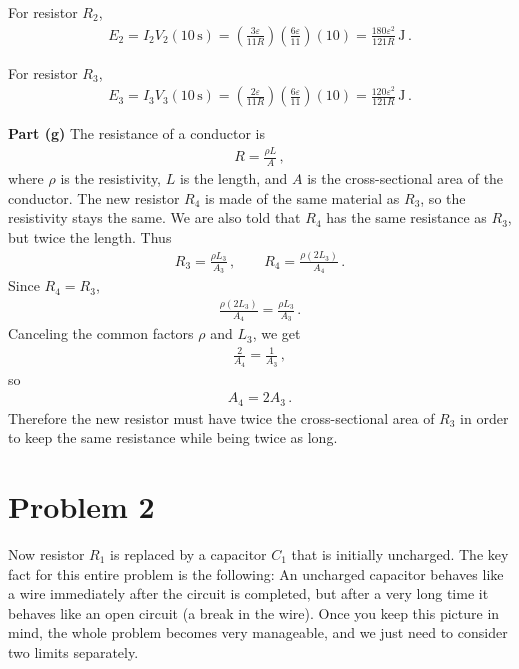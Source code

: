 \documentclass[11pt]{article}
\begin{document}
For resistor $R_2$,
\begin{align*}
E_2 = I_2V_2(10\,\text{s})
= \left(\frac{3\varepsilon}{11R}\right)\left(\frac{6\varepsilon}{11}\right)(10)
= \frac{180\varepsilon^2}{121R}\,\text{J}\,.
\end{align*}

For resistor $R_3$,
\begin{align*}
E_3 = I_3V_3(10\,\text{s})
= \left(\frac{2\varepsilon}{11R}\right)\left(\frac{6\varepsilon}{11}\right)(10)
= \frac{120\varepsilon^2}{121R}\,\text{J}\,.
\end{align*}

\noindent\textbf{Part (g)} The resistance of a conductor is
\begin{align*}
R = \frac{\rho L}{A}\,,
\end{align*}
where $\rho$ is the resistivity, $L$ is the length, and $A$ is the cross-sectional area of the conductor. The new resistor $R_4$ is made of the same material as $R_3$, so the resistivity stays the same. We are also told that $R_4$ has the same resistance as $R_3$, but twice the length. Thus
\begin{align*}
R_3 = \frac{\rho L_3}{A_3}\,,\qquad
R_4 = \frac{\rho (2L_3)}{A_4}\,.
\end{align*}
Since $R_4=R_3$,
\begin{align*}
\frac{\rho (2L_3)}{A_4} = \frac{\rho L_3}{A_3}\,.
\end{align*}
Canceling the common factors $\rho$ and $L_3$, we get
\begin{align*}
\frac{2}{A_4} = \frac{1}{A_3}\,,
\end{align*}
so
\begin{align*}
A_4 = 2A_3\,.
\end{align*}
Therefore the new resistor must have twice the cross-sectional area of $R_3$ in order to keep the same resistance while being twice as long.\\

\newpage
\section*{Problem 2}

Now resistor $R_1$ is replaced by a capacitor $C_1$ that is initially uncharged. The key fact for this entire problem is the following: An uncharged capacitor behaves like a wire immediately after the circuit is completed, but after a very long time it behaves like an open circuit (a break in the wire). Once you keep this picture in mind, the whole problem becomes very manageable, and we just need to consider two limits separately.\\
\end{document}
